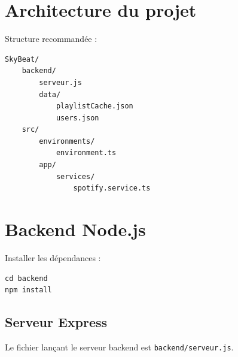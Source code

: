 \documentclass[a4paper,11pt]{article}
\begin{document}
\section{Architecture du projet}

Structure recommandée :

\begin{lstlisting}
SkyBeat/
    backend/
        serveur.js
        data/
            playlistCache.json
            users.json
    src/
        environments/
            environment.ts
        app/
            services/
                spotify.service.ts
\end{lstlisting}

\section{Backend Node.js}

Installer les dépendances :

\begin{lstlisting}
cd backend
npm install
\end{lstlisting}

\subsection{Serveur Express}

Le fichier lançant le serveur backend est \texttt{backend/serveur.js}.
\end{document}
